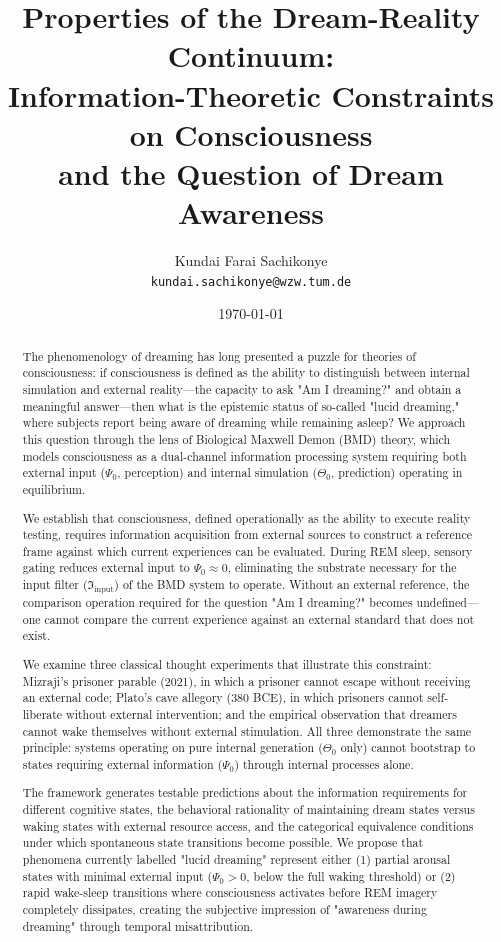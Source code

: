 \documentclass[11pt,a4paper]{article}
\title{\textbf{Properties of the Dream-Reality Continuum:\\[0.5em]
Information-Theoretic Constraints on Consciousness\\
and the Question of Dream Awareness}}
\author{
Kundai Farai Sachikonye\\
\texttt{kundai.sachikonye@wzw.tum.de}
}
\date{\today}
\begin{document}
\maketitle

\begin{abstract}
The phenomenology of dreaming has long presented a puzzle for theories of consciousness: if consciousness is defined as the ability to distinguish between internal simulation and external reality—the capacity to ask "Am I dreaming?" and obtain a meaningful answer—then what is the epistemic status of so-called "lucid dreaming," where subjects report being aware of dreaming while remaining asleep? We approach this question through the lens of Biological Maxwell Demon (BMD) theory, which models consciousness as a dual-channel information processing system requiring both external input ($\Psi_0$, perception) and internal simulation ($\Theta_0$, prediction) operating in equilibrium.

We establish that consciousness, defined operationally as the ability to execute reality testing, requires information acquisition from external sources to construct a reference frame against which current experiences can be evaluated. During REM sleep, sensory gating reduces external input to $\Psi_0 \approx 0$, eliminating the substrate necessary for the input filter ($\Im_{\text{input}}$) of the BMD system to operate. Without an external reference, the comparison operation required for the question "Am I dreaming?" becomes undefined—one cannot compare the current experience against an external standard that does not exist.

We examine three classical thought experiments that illustrate this constraint: Mizraji's prisoner parable (2021), in which a prisoner cannot escape without receiving an external code; Plato's cave allegory (380 BCE), in which prisoners cannot self-liberate without external intervention; and the empirical observation that dreamers cannot wake themselves without external stimulation. All three demonstrate the same principle: systems operating on pure internal generation ($\Theta_0$ only) cannot bootstrap to states requiring external information ($\Psi_0$) through internal processes alone.

The framework generates testable predictions about the information requirements for different cognitive states, the behavioral rationality of maintaining dream states versus waking states with external resource access, and the categorical equivalence conditions under which spontaneous state transitions become possible. We propose that phenomena currently labelled "lucid dreaming" represent either (1) partial arousal states with minimal external input ($\Psi_0 > 0$, below the full waking threshold) or (2) rapid wake-sleep transitions where consciousness activates before REM imagery completely dissipates, creating the subjective impression of "awareness during dreaming" through temporal misattribution.


\end{abstract}
\end{document}
